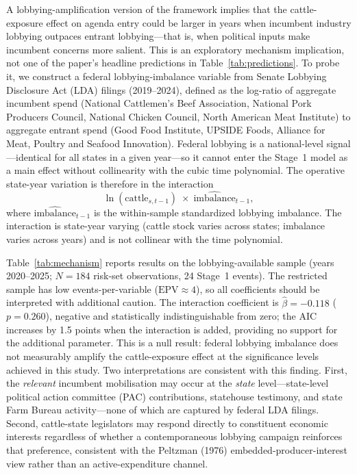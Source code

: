 \documentclass[12pt]{article}
\begin{document}
A lobbying-amplification version of the framework implies that the cattle-exposure effect on agenda entry could be larger in years when incumbent industry lobbying outpaces entrant lobbying---that is, when political inputs make incumbent concerns more salient.  This is an exploratory mechanism implication, not one of the paper's headline predictions in Table~\ref{tab:predictions}.  To probe it, we construct a federal lobbying-imbalance variable from Senate Lobbying Disclosure Act (LDA) filings (2019--2024), defined as the log-ratio of aggregate incumbent spend (National Cattlemen's Beef Association, National Pork Producers Council, National Chicken Council, North American Meat Institute) to aggregate entrant spend (Good Food Institute, UPSIDE Foods, Alliance for Meat, Poultry and Seafood Innovation).  Federal lobbying is a national-level signal---identical for all states in a given year---so it cannot enter the Stage~1 model as a main effect without collinearity with the cubic time polynomial.  The operative state-year variation is therefore in the interaction
\[
  \ln(\text{cattle}_{s,t-1}) \;\times\; \widehat{\text{imbalance}}_{t-1},
\]
where $\widehat{\text{imbalance}}_{t-1}$ is the within-sample standardized lobbying imbalance.  The interaction is state-year varying (cattle stock varies across states; imbalance varies across years) and is not collinear with the time polynomial.



Table~\ref{tab:mechanism} reports results on the lobbying-available sample (years 2020--2025; $N = 184$ risk-set observations, 24 Stage~1 events).  The restricted sample has low events-per-variable ($\text{EPV} \approx 4$), so all coefficients should be interpreted with additional caution.  The interaction coefficient is $\hat{\beta} = -0.118$ ($p = 0.260$), negative and statistically indistinguishable from zero; the AIC increases by 1.5 points when the interaction is added, providing no support for the additional parameter.  This is a null result: federal lobbying imbalance does not measurably amplify the cattle-exposure effect at the significance levels achieved in this study.  Two interpretations are consistent with this finding.  First, the \emph{relevant} incumbent mobilisation may occur at the \emph{state} level---state-level political action committee (PAC) contributions, statehouse testimony, and state Farm Bureau activity---none of which are captured by federal LDA filings.  Second, cattle-state legislators may respond directly to constituent economic interests regardless of whether a contemporaneous lobbying campaign reinforces that preference, consistent with the Peltzman (1976) embedded-producer-interest view rather than an active-expenditure channel.
\end{document}
